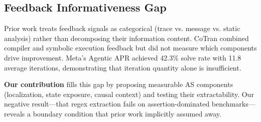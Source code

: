 \subsection{Feedback Informativeness Gap}

Prior work treats feedback signals as categorical (trace vs. message vs. static analysis) rather than decomposing their information content. CoTran \citep{cotran2023} combined compiler and symbolic execution feedback but did not measure which components drive improvement. Meta's Agentic APR \citep{agenticapr2025} achieved 42.3\% solve rate with 11.8 average iterations, demonstrating that iteration quantity alone is insufficient.

\textbf{Our contribution} fills this gap by proposing measurable AS components (localization, state exposure, causal context) and testing their extractability. Our negative result---that regex extraction fails on assertion-dominated benchmarks---reveals a boundary condition that prior work implicitly assumed away.
